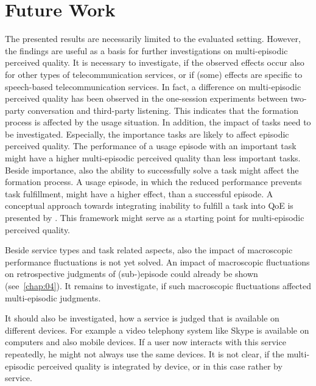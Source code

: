 \section{Future Work}
The presented results are necessarily limited to the evaluated setting.
However, the findings are useful as a basis for further investigations on multi-episodic perceived quality.
It is necessary to investigate, if the observed effects occur also for other types of telecommunication services, or if (some) effects are specific to speech-based telecommunication services.
In fact, a difference on multi-episodic perceived quality has been observed in the one-session experiments between two-party conversation and third-party listening.
This indicates that the formation process is affected by the usage situation.
In addition, the impact of tasks need to be investigated.
Especially, the importance tasks are likely to affect episodic perceived quality.
The performance of a usage episode with an important task might have a higher multi-episodic perceived quality than less important tasks.
Beside importance, also the ability to successfully solve a task might affect the formation process.
A usage episode, in which the reduced performance prevents task fulfillment, might have a higher effect, than a successful episode.
A conceptual approach towards integrating inability to fulfill a task into \ac{QoE} is presented by \citet{leon-garcia_generalizing_2014}.
This framework might serve as a starting point for multi-episodic perceived quality.

Beside service types and task related aspects, also the impact of macroscopic performance fluctuations is not yet solved.
An impact of macroscopic fluctuations on retrospective judgments of (sub-)episode could already be shown (see~\autoref{chap:04}).
It remains to investigate, if such macroscopic fluctuations affected multi-episodic judgments.

It should also be investigated, how a service is judged that is available on different devices.
For example a video telephony system like Skype is available on computers and also mobile devices.
If a user now interacts with this service repeatedly, he might not always use the same devices.
It is not clear, if the multi-episodic perceived quality is integrated by device, or in this case rather by service.